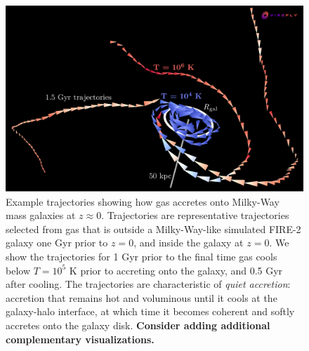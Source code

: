 \documentclass[fleqn,usenatbib]{mnras}
\begin{document}
\begin{figure}
    \centering
    \includegraphics[width=\textwidth]{figures/illustrative_tracks/illustrative_tracks.png}
    \caption{
Example trajectories showing how gas accretes onto Milky-Way mass galaxies at $z\approx0$.
Trajectories are representative trajectories selected from gas that is outside a Milky-Way-like simulated FIRE-2 galaxy one Gyr prior to $z=0$, and inside the galaxy at $z=0$.
We show the trajectories for 1 Gyr prior to the final time gas cools below $T=10^5$ K prior to accreting onto the galaxy, and 0.5 Gyr after cooling.
The trajectories are characteristic of \textit{quiet accretion}:
accretion that remains hot and voluminous until it cools at the galaxy-halo interface, at which time it becomes coherent and softly accretes onto the galaxy disk.
\textbf{
Consider adding additional complementary visualizations.
    }
    }
    \label{f: overview}
\end{figure}
\end{document}
